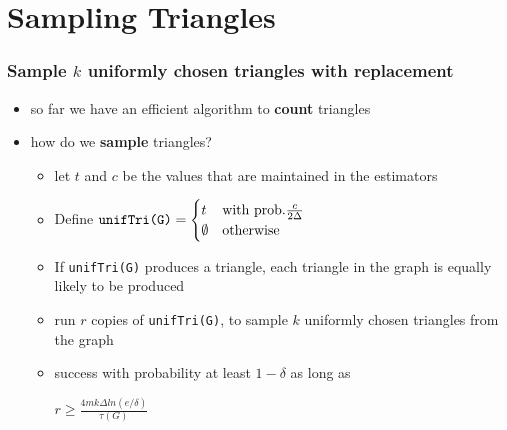 \documentclass[11pt]{beamer}
\begin{document}
\section{Sampling Triangles}
\begin{frame}
\frametitle{Sample $k$ uniformly chosen triangles with replacement}
\begin{itemize}
\item so far we have an efficient algorithm to \textbf{count} triangles
\item how do we \textbf{sample} triangles?
\begin{itemize}
\item let $t$ and $c$ be the values that are maintained in the estimators
\item Define $\text{\texttt{unifTri(G)}}=\begin{cases}t& \text{with prob.}\frac{c}{2\Delta}\\\emptyset & \text{otherwise}\end{cases}$
\item If \texttt{unifTri(G)} produces a triangle, each triangle in the graph is equally likely to be produced
\item run $r$ copies of \texttt{unifTri(G)}, to sample $k$ uniformly chosen triangles from the graph
\item success with probability at least $1-\delta$ as long as 
\begin{center}
$r\geq\frac{4mk\Delta ln(e/\delta)}{\tau(G)}$
\end{center}
\end{itemize}
\end{itemize}
\begin{center}

\end{center}

\end{frame}
\end{document}
